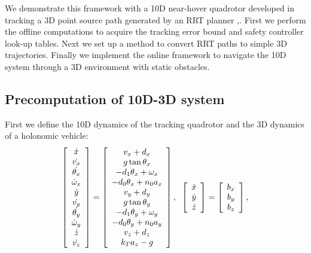 We demonstrate this framework with a 10D near-hover quadrotor developed in \cite{Bouffard12} tracking a 3D point source path generated by an RRT planner \cite{Kuffner2000},\cite{Kavraki1996}. First we perform the offline computations to acquire the tracking error bound and safety controller look-up tables. Next we set up a method to convert RRT paths to simple 3D trajectories. Finally we implement the online framework to navigate the 10D system through a 3D environment with static obstacles.

\subsection{Precomputation of 10D-3D system}
First we define the 10D dynamics of the tracking quadrotor and the 3D dynamics of a holonomic vehicle:
\begin{equation}
\small
\label{eq:Quad10D_dyn}
\begin{aligned}
\begin{array}{c}
\left[
\begin{array}{c}
\dot{x}\\
\dot{v_x}\\
\dot{\theta_x}\\
\dot\omega_x\\
\dot{y}\\
\dot{v_y}\\
\dot{\theta_y}\\
\dot\omega_y\\
\dot{z}\\
\dot{v_z}
\end{array}
\right]
=
\left[
\begin{array}{c}
v_x + d_x\\
g \tan \theta_x\\
-d_1 \theta_x + \omega_x\\
-d_0 \theta_x + n_0 a_x\\
v_y + d_y\\
g \tan \theta_y\\
-d_1 \theta_y + \omega_y\\
-d_0 \theta_y + n_0 a_y\\
v_z + d_z\\
k_T a_z - g
\end{array}
\right],\;\;
\left[
\begin{array}{c}
\dot{x}\\
\dot{y}\\
\dot{z}\\
\end{array}
\right] 
=
\left[
\begin{array}{c}
b_x\\
b_y\\
b_z \\
\end{array}
\right],
\end{array}\\
\end{aligned}
\end{equation}
